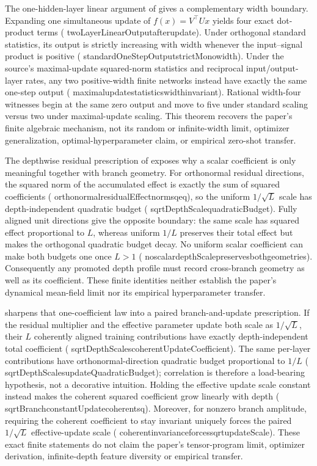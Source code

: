 \documentclass[11pt]{article}
\newcommand{\leanname}[1]{{\scriptsize\ttfamily
  \def\_{\textunderscore\allowbreak}#1}}
\begin{document}
The one-hidden-layer linear argument of \cite{yang2022mup} gives a complementary
width boundary. Expanding one simultaneous update of
$f(x)=V^\top Ux$ yields four exact dot-product terms
(\leanname{twoLayerLinearOutput\_after\_update}). Under orthogonal standard
statistics, its output is strictly increasing with width whenever the
input--signal product is positive
(\leanname{standardOneStepOutput\_strictMono\_width}). Under the source's
maximal-update squared-norm statistics and reciprocal input/output-layer
rates, any two positive-width finite networks instead have exactly the same
one-step output
(\leanname{maximal\_update\_statistics\_width\_invariant}). Rational
width-four witnesses begin at the same zero output and move to five under
standard scaling versus two under maximal-update scaling. This theorem
recovers the paper's finite algebraic mechanism, not its random or
infinite-width limit, optimizer generalization, optimal-hyperparameter claim,
or empirical zero-shot transfer.

The depthwise residual prescription of \cite{bordelon2023depth} exposes why a
scalar coefficient is only meaningful together with branch geometry. For
orthonormal residual directions, the squared norm of the accumulated effect is
exactly the sum of squared coefficients
(\leanname{orthonormal\_residualEffect\_norm\_sq\_eq}), so the uniform
$1/\sqrt L$ scale has depth-independent quadratic budget
(\leanname{sqrtDepthScale\_quadraticBudget}). Fully aligned unit directions
give the opposite boundary: the same scale has squared effect proportional to
$L$, whereas uniform $1/L$ preserves their total effect but makes the
orthogonal quadratic budget decay. No uniform scalar coefficient can make both
budgets one once $L>1$
(\leanname{no\_scalar\_depthScale\_preserves\_both\_geometries}).
Consequently any promoted depth profile must record cross-branch geometry as
well as its coefficient. These finite identities neither establish the
paper's dynamical mean-field limit nor its empirical hyperparameter transfer.

\cite{yang2023depthmup} sharpens that one-coefficient law into a paired
branch-and-update prescription. If the residual multiplier and the effective
parameter update both scale as $1/\sqrt L$, their $L$ coherently aligned
training contributions have exactly depth-independent total coefficient
(\leanname{sqrtDepthScales\_coherentUpdateCoefficient}). The same per-layer
contributions have orthonormal-direction quadratic budget proportional to
$1/L$
(\leanname{sqrtDepthScales\_updateQuadraticBudget}); correlation is therefore
a load-bearing hypothesis, not a decorative intuition. Holding the effective
update scale constant instead makes the coherent squared coefficient grow
linearly with depth
(\leanname{sqrtBranch\_constantUpdate\_coherent\_sq}). Moreover, for nonzero
branch amplitude, requiring the coherent coefficient to stay invariant
uniquely forces the paired $1/\sqrt L$ effective-update scale
(\leanname{coherent\_invariance\_forces\_sqrt\_updateScale}). These exact
finite statements do not claim the paper's tensor-program limit, optimizer
derivation, infinite-depth feature diversity or empirical transfer.
\end{document}
